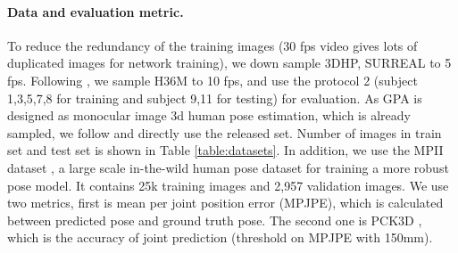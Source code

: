 \documentclass[runningheads]{llncs}
\begin{document}
\paragraph{Data and evaluation metric.} To reduce the redundancy of the
training images  (30 fps video gives lots of duplicated images for network
training), we down sample 3DHP, SURREAL to 5 fps. Following
\cite{rootnet,Zhou_2017_ICCV}, we sample H36M to 10 fps, and use the protocol 2
(subject 1,3,5,7,8 for training and subject 9,11 for testing) for evaluation.
As GPA is designed as monocular image 3d human pose estimation, which is
already sampled, we follow \cite{gpa} and directly use the released set. Number
of images in train set and test set is shown in Table \ref{table:datasets}.
In addition,  we use the MPII dataset \cite{mpii}, a large scale in-the-wild
human pose dataset for training a more robust   pose model. It contains 25k
training images and 2,957 validation images. We use two metrics, first is mean
per joint position error (MPJPE), which is calculated between predicted pose
and ground truth pose.  The second one is PCK3D \cite{mono_3dhp2017}, which is the accuracy of joint prediction (threshold on MPJPE with 150mm). 
\end{document}
